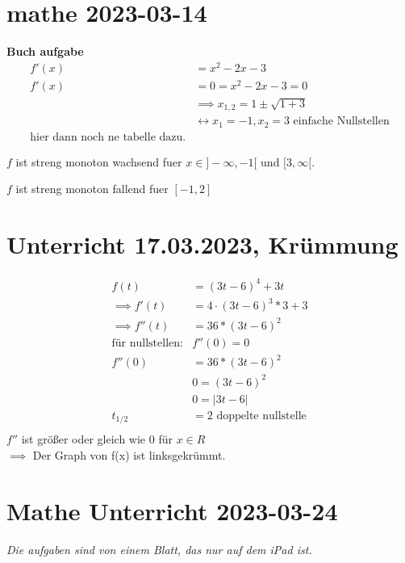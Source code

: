 \documentclass{report}
\begin{document}
\section{mathe 2023-03-14}
\textbf{Buch aufgabe}
\begin{align*}
    f'(x)&= x^2-2x-3\\
    f'(x)&=0=x^2-2x-3=0\\
         &\implies x_{1,2}=1\pm \sqrt{1+3}\\
         &\leftrightarrow x_1 = -1, x_2=\text{3 einfache Nullstellen}\\
         \text{hier dann noch ne tabelle dazu.}
\end{align*}

$f$ ist streng monoton wachsend fuer $x \in]-\infty, -1[$ und $[3,\infty [$.

$f$ ist streng monoton fallend fuer $[-1,2]$


\section{Unterricht 17.03.2023, Krümmung}
\begin{multicols}{2}
  \center
  
  
\end{multicols}

\begin{align*}
  f(t)&=(3t-6)^4+3t\\
  \implies f'(t)&=4\cdot (3t-6)^3*3+3\\
  \implies f''(t)&=36* (3t-6)^2\\
  \text{für nullstellen:} &f''(0)=0\\
  f''(0)&=36*(3t-6)^2\\
  &0=(3t-6)^2\\
  &0=|3t-6|\\
  t_{1/2}&=2 \text{ doppelte nullstelle}\\
\end{align*}
$f''$ ist größer oder gleich wie 0 für $x \in R$\\
$\implies$ Der Graph von f(x) ist linksgekrümmt.

\section{Mathe Unterricht 2023-03-24}

\textit{Die aufgaben sind von einem Blatt, das nur auf dem iPad ist.}\\
\end{document}
